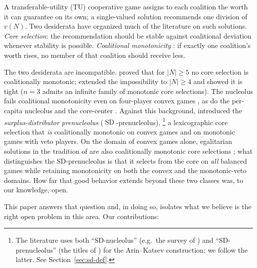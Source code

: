 \documentclass[11pt]{article}
\newcommand{\SD}{\operatorname{SD}}
\begin{document}
A transferable-utility (TU) cooperative game assigns to each coalition the
worth it can guarantee on its own; a single-valued solution recommends one
division of $v(N)$. Two desiderata have organized much of the literature on
such solutions. \emph{Core selection}: the recommendation should be stable
against coalitional deviation whenever stability is possible.
\emph{Coalitional monotonicity} \citep{Young85}: if exactly one
coalition's worth rises, no member of that coalition should receive less.

The two desiderata are incompatible. \citet{Young85} proved that for
$|N|\ge 5$ no core selection is coalitionally monotonic; \citet{HousmanClark98} extended the impossibility to $|N|\ge 4$ and showed it
is tight ($n=3$ admits an infinite family of monotonic core selections). The
nucleolus fails coalitional monotonicity even on four-player convex games
\citep{Hokari2000}, as do the per-capita nucleolus \citep{Arin2013}
and the core-center \citep{MirasCalvo2021}. Against this background,
\citet{ArinKatsev2011,ArinKatsev2014,ArinKatsev2016,ArinKatsev2018}
introduced the \emph{surplus-distributor prenucleolus}
($\SD$-prenucleolus),%
\footnote{The literature uses both ``SD-nucleolus'' (e.g.\ the survey of \citealp{Inarra2020}) and ``SD-prenucleolus'' (the titles of
\citealp{ArinKatsev2011,ArinKatsev2014}) for the Arin--Katsev construction; we
follow the latter. See Section~\ref{sec:sd-def}.}
a lexicographic core selection that \emph{is} coalitionally monotonic on
convex games and on monotonic games with veto players. On the domain of
convex games alone, egalitarian solutions in the tradition of \citet{DuttaRay89} are
also coalitionally monotonic core selections \citep{Dietzenbacher2021}; what
distinguishes the SD-prenucleolus is that it selects from the core on
\emph{all} balanced games while retaining monotonicity on both the convex
and the monotonic-veto domains. How far that good behavior extends beyond
these two classes was, to our knowledge, open.

This paper answers that question and, in doing so, isolates what we believe
is the right open problem in this area. Our contributions:
\end{document}
